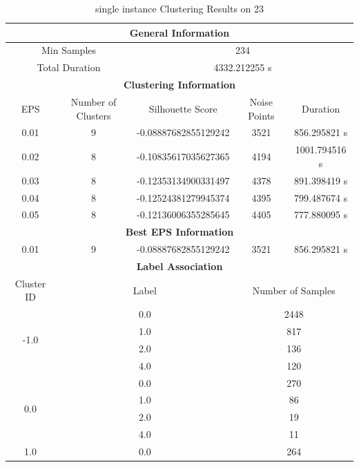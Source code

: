\begin{longtable}{|c|c|c|c|c|}
\caption{single instance Clustering Results on 23} \label{tab:23_single_instance_clustering_results}\\
\hline
\multicolumn{5}{|c|}{\textbf{General Information}} \\
\hline
\multicolumn{2}{|c|}{Min Samples} & \multicolumn{3}{c|}{234} \\
\multicolumn{2}{|c|}{Total Duration} & \multicolumn{3}{c|}{4332.212255 s} \\
\hline
\multicolumn{5}{|c|}{\textbf{Clustering Information}} \\
\hline
EPS & Number of Clusters & Silhouette Score & Noise Points & Duration \\
0.01 & 9 & -0.08887682855129242 & 3521 & 856.295821 s\\
0.02 & 8 & -0.10835617035627365 & 4194 & 1001.794516 s\\
0.03 & 8 & -0.12353134900331497 & 4378 & 891.398419 s\\
0.04 & 8 & -0.12524381279945374 & 4395 & 799.487674 s\\
0.05 & 8 & -0.12136006355285645 & 4405 & 777.880095 s\\
\hline
\multicolumn{5}{|c|}{\textbf{Best EPS Information}} \\
\hline
0.01 & 9 & -0.08887682855129242 & 3521 & 856.295821 s\\
\hline
\multicolumn{5}{|c|}{\textbf{Label Association}} \\
\hline
Cluster ID & \multicolumn{2}{c|}{Label} & \multicolumn{2}{c|}{Number of Samples} \\
\hline
\multirow{4}{*}{-1.0} & \multicolumn{2}{c|}{0.0} & \multicolumn{2}{c|}{2448} \\
& \multicolumn{2}{c|}{1.0} & \multicolumn{2}{c|}{817} \\
& \multicolumn{2}{c|}{2.0} & \multicolumn{2}{c|}{136} \\
& \multicolumn{2}{c|}{4.0} & \multicolumn{2}{c|}{120} \\
\hline
\multirow{4}{*}{0.0} & \multicolumn{2}{c|}{0.0} & \multicolumn{2}{c|}{270} \\
& \multicolumn{2}{c|}{1.0} & \multicolumn{2}{c|}{86} \\
& \multicolumn{2}{c|}{2.0} & \multicolumn{2}{c|}{19} \\
& \multicolumn{2}{c|}{4.0} & \multicolumn{2}{c|}{11} \\
\hline
\multirow{4}{*}{1.0} & \multicolumn{2}{c|}{0.0} & \multicolumn{2}{c|}{264} \\

\end{longtable}
